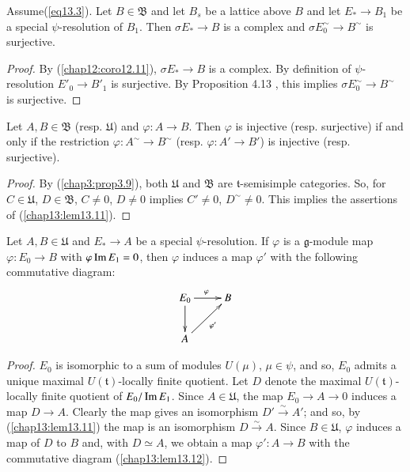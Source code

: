 \begin{lemma}\label{chap13:lem13.10}
Assume\pageoriginale (\ref{eq13.3}). Let $B \in \mathfrak{B}$ and let $B_s$ be
a lattice above $B$ and let $E_* \to B_1$ be a special
$\psi$-resolution of $B_1$. Then $\sigma E_* \to B$ is a complex and
$\sigma E^\sim_0 \to B^\sim$ is surjective. 
\end{lemma}

\begin{proof}
By (\ref{chap12:coro12.11}), $\sigma E_* \to B$ is a complex. By definition of
$\psi$-resolution $E'_0 \to B'_1$ is surjective. By Proposition 4.13
\cite{key15}, this implies  $\sigma E^\sim_0 \to B^\sim$ is
surjective. 
\end{proof}

\begin{lemma}\label{chap13:lem13.11}
Let $A, B \in \mathfrak{B}$ (resp. $\mathfrak{U}$) and $\varphi: A \to
B$. Then $\varphi$ is injective (resp. surjective) if and only if the
restriction $\varphi: A^\sim \to B^\sim$ (resp. $\varphi: A' \to B'$)
is injective (resp. surjective). 
\end{lemma}

\begin{proof}
By (\ref{chap3:prop3.9}), both $\mathfrak{U}$ and $\mathfrak{B}$ are
$\mathfrak{t}$-semisimple categories. So, for $C \in \mathfrak{U}$, $D
\in \mathfrak{B}$, $C \neq 0$, $D \neq 0$ implies $C' \neq 0$, $D^\sim
\neq 0$. This implies the assertions of (\ref{chap13:lem13.11}). 
\end{proof}

\begin{lemma}\label{chap13:lem13.12}
Let $A, B\in \mathfrak{U}$ and $E_* \to A$ be a special
$\psi$-resolution. If $\varphi$ is a $\mathfrak{g}$-module map
$\varphi: E_0 \to B$ with $\varphi \operatorname{Im} E_1 = 0$, then $\varphi$
induces a map $\varphi'$ with the following commutative diagram:
$$
\xymatrix{
E_0  \ar[r]^\varphi \ar[d] & B\\
A \ar[ur]_{\varphi'} & 
}
$$
\end{lemma}

\begin{proof}
$E_0$ is isomorphic to a sum of modules $U(\mu)$, $\mu \in \psi$, and
  so, $E_0$ admits a unique maximal $U(\mathfrak{t})$-locally finite
  quotient. Let $D$ denote the maximal $U(\mathfrak{t})$-locally
  finite quotient of $E_0 / \operatorname{Im} E_1$. Since $A \in \mathfrak{U}$, the
  map $E_0 \to A \to 0$ induces a map $D \to A$. Clearly the map gives
  an isomorphism $D' \xrightarrow{\sim} A'$; and so, by
  (\ref{chap13:lem13.11}) the
  map is an isomorphism $D \xrightarrow{\sim} A $. Since\pageoriginale
  $B \in \mathfrak{U}$, $\varphi$ induces a map of $D$ to $B$ and,
  with $D \simeq A$, we obtain a map $\varphi': A \to B$ with the
  commutative diagram (\ref{chap13:lem13.12}). 
\end{proof}


